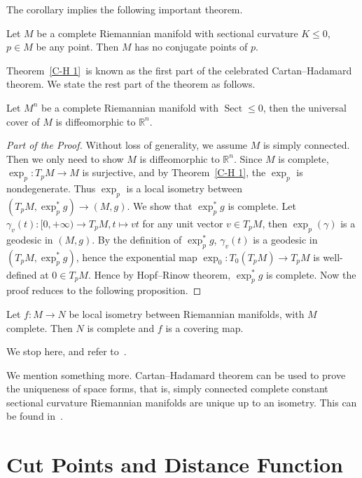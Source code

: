 The corollary implies the following important theorem.
\begin{thm}\label{C-H 1}
    Let $M$ be a complete Riemannian manifold with sectional curvature $K\leq 0$, $p\in M$ be any point.
    Then $M$ has no conjugate points of $p$.
\end{thm}

Theorem~\ref{C-H 1}~is known as the first part of the celebrated Cartan--Hadamard theorem.
We state the rest part of the theorem as follows.
\begin{thm}
    Let $M^n$ be a complete Riemannian manifold with $\operatorname{Sect}\leq 0$, then the universal cover of $M$ is diffeomorphic to $\mathbb{R}^n$.
\end{thm}
\begin{proof}[Part of the Proof]
    Without loss of generality, we assume $M$ is simply connected.
    Then we only need to show $M$ is diffeomorphic to $\mathbb{R}^n$.
    Since $M$ is complete, $\exp_p:T_pM\to M$ is surjective, and by Theorem~\ref{C-H 1}, the $\exp_p$ is nondegenerate.
    Thus $\exp_p$ is a local isometry between $(T_pM,\exp_p^*g)\to(M,g)$.
    We show that $\exp_p^*g$ is complete.
    Let $\gamma_v(t):[0,+\infty)\to T_pM, t\mapsto vt$ for any unit vector $v\in T_pM$, then $\exp_p(\gamma)$ is a geodesic in $(M,g)$.
    By the definition of $\exp_p^*g$, $\gamma_v(t)$ is a geodesic in $(T_pM,\exp_p^*g)$, hence the exponential map $\exp_0:T_0(T_pM)\to T_pM$ is well-defined at $0\in T_pM$.
    Hence by Hopf--Rinow theorem, $\exp_p^*g$ is complete.
    Now the proof reduces to the following proposition.
\end{proof}

\begin{prop}
    Let $f:M\to N$ be local isometry between Riemannian manifolds, with $M$ complete.
    Then $N$ is complete and $f$ is a covering map.
\end{prop}

We stop here, and refer to~\cite[Lemma~5.6.4]{Petersen}.

We mention something more.
Cartan--Hadamard theorem can be used to prove the uniqueness of space forms, that is, simply connected complete constant sectional curvature Riemannian manifolds are unique up to an isometry.
This can be found in~\cite[Chapter~5]{Wu}.

\section{Cut Points and Distance Function}

